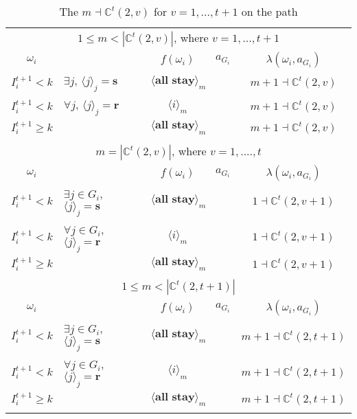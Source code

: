 \documentclass[12pt,letter]{article}
\newcommand{\Kappa}{\mathbb{C}}
\theoremstyle{definition}
\theoremstyle{remark}
\theoremstyle{claim}
\begin{document}
\begin{table}[!htbp]
\caption{The $m\dashv\Kappa^t(2,v)$ for $v=1,...,t+1$ on the path}
\label{table:eqm_path_kt2}
\begin{center}
\begin{tabular}{c l | c | c | c}
\multicolumn{5}{c}{$1\leq m < |\Kappa^t(2,v)|$, where $v=1,...,t+1$}\\
$\omega_i$ 	 & 	   &	$f(\omega_i)$  &	$a_{G_i}$ & $\lambda(\omega_i,a_{G_i})$ \\
\hline
\hline
$I^{t+1}_i< k$  	& 	$\exists j$, $\langle j \rangle_j=\textbf{s}$	& $\langle \textbf{all stay} \rangle_m$		&  	& $m+1\dashv \Kappa^t(2,v)$\\
$I^{t+1}_i< k$  	& 	$\forall j$, $\langle j \rangle_j=\textbf{r}$	& $\langle i \rangle_m$		&  	& $m+1\dashv \Kappa^t(2,v)$\\
$I^{t+1}_i\geq k$	 & 				& $\langle \textbf{all stay} \rangle_m$ 	& 		& $m+1\dashv \Kappa^t(2,v)$\\
\hline
\\
\multicolumn{5}{c}{$m= |\Kappa^t(2,v)|$, where $v=1,....,t$}\\
$\omega_i$ 	 & 	   &	$f(\omega_i)$  &	$a_{G_i}$ & $\lambda(\omega_i,a_{G_i})$ \\
\hline
\hline
$I^{t+1}_i< k$  	& 	$\exists j\in G_i$, $\langle j \rangle_j=\textbf{s}$	& $\langle \textbf{all stay} \rangle_m$		&  	& $1\dashv \Kappa^t(2,v+1)$\\
$I^{t+1}_i< k$  	& 	$\forall j\in G_i$, $\langle j \rangle_j=\textbf{r}$	& $\langle i \rangle_m$		&  	& $1\dashv \Kappa^t(2,v+1)$\\
$I^{t+1}_i\geq k$	 & 				& $\langle \textbf{all stay} \rangle_m$ 	& 		& $1\dashv \Kappa^t(2,v+1)$\\
\hline
\\
\multicolumn{5}{c}{$1\leq m < |\Kappa^t(2,t+1)|$}\\
$\omega_i$ 	 & 	   &	$f(\omega_i)$  &	$a_{G_i}$ & $\lambda(\omega_i,a_{G_i})$ \\
\hline
\hline
$I^{t+1}_i< k$  	& 	$\exists j\in G_i$, $\langle j \rangle_j=\textbf{s}$	& $\langle \textbf{all stay} \rangle_m$		&  	& $m+1\dashv \Kappa^t(2,t+1)$\\
$I^{t+1}_i< k$  	& 	$\forall j\in G_i$, $\langle j \rangle_j=\textbf{r}$	& $\langle i \rangle_m$		&  	& $m+1\dashv \Kappa^t(2,t+1)$\\
$I^{t+1}_i\geq k$	 & 				& $\langle \textbf{all stay} \rangle_m$ 	& 		& $m+1\dashv \Kappa^t(2,t+1)$\\
\hline
\\

\end{tabular}
\end{center}
\end{table}
\end{document}

